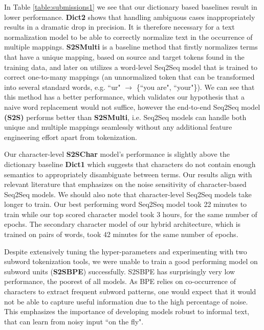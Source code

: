\documentclass[letterpaper]{article} \usepackage{aaai19}  \usepackage{times}  \usepackage{helvet} \usepackage{courier}  \usepackage[hyphens]{url}  \usepackage{graphicx} \urlstyle{rm} \def\UrlFont{\rm}  \usepackage{graphicx}  \frenchspacing  \setlength{\pdfpagewidth}{8.5in}  \setlength{\pdfpageheight}{11in}
\newcommand{\citep}{\cite}
\begin{document}
In Table \ref{table:submissions1} we see that our dictionary based baselines result in lower performance. \textbf{Dict2} shows that handling ambiguous cases inappropriately results in a dramatic drop in precision. It is therefore necessary for a text normalization model to be able to correctly normalize text in the occurrence of multiple mappings.  \textbf{S2SMulti} is a baseline method that firstly normalizes terms that have a unique mapping, based on source and target tokens found in the training data, and later on utilizes a word-level Seq2Seq model that is trained to correct one-to-many mappings (an unnormalized token that can be transformed into several standard words, e.g. ``ur" $\rightarrow$ \{``you are", ``your"\}). We can see that this method has a better performance, which validates our hypothesis that a naive word replacement would not suffice, however the end-to-end  Seq2Seq model \textbf{(S2S)} performs better than \textbf{S2SMulti}, i.e. Seq2Seq models can handle both unique and multiple mappings seamlessly without any additional feature engineering effort apart from tokenization. 

Our character-level \textbf{S2SChar} model's performance is slightly above the dictionary baseline \textbf{Dict1} which suggests that characters do not contain enough semantics to appropriately disambiguate between terms. Our results align with relevant literature \citep{belinkov2017synthetic} that emphasizes on the noise sensitivity of character-based Seq2Seq models. We should also note that character-level Seq2Seq models take longer to train. Our best performing word Seq2Seq model took 22 minutes to train while our top scored character model took 3 hours, for the same number of epochs. The secondary character model of our hybrid architecture, which is trained on pairs of words, took 42 minutes for the same number of epochs.  

Despite extensively tuning the hyper-parameters and experimenting with two subword tokenization tools, we were unable to train a good performing model on subword units (\textbf{S2SBPE}) successfully. S2SBPE has surprisingly very low performance, the poorest of all models. As BPE relies on co-occurrence of characters to extract frequent subword patterns, one would expect that it would not be able to capture useful information due to the high percentage of noise. This emphasizes the importance of developing models robust to informal text, that can learn from noisy input ``on the fly".
\end{document}
